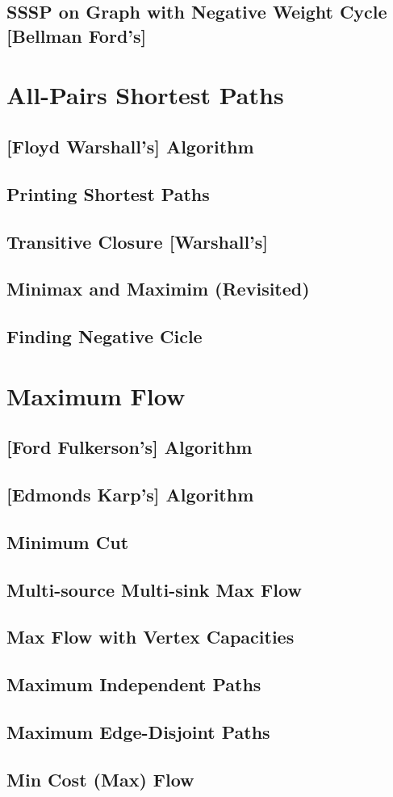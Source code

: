 	\subsection {SSSP on Graph with Negative Weight Cycle [Bellman Ford's]}
\section {All-Pairs Shortest Paths}
	\subsection {[Floyd Warshall's] Algorithm}
	\subsection {Printing Shortest Paths}
	\subsection {Transitive Closure [Warshall's]}
	\subsection {Minimax and Maximim (Revisited)}
	\subsection {Finding Negative Cicle}
\section {Maximum Flow}
	\subsection {[Ford Fulkerson's] Algorithm}
	\subsection {[Edmonds Karp's] Algorithm}
	\subsection {Minimum Cut}
	\subsection {Multi-source Multi-sink Max Flow}
	\subsection {Max Flow with Vertex Capacities}
	\subsection {Maximum Independent Paths}
	\subsection {Maximum Edge-Disjoint Paths}
	\subsection {Min Cost (Max) Flow}
